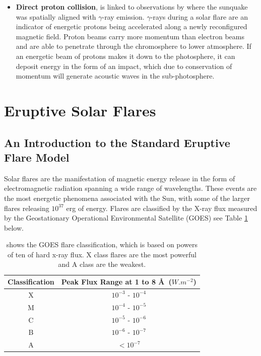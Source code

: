 \begin{itemize}
\item \textbf{Direct proton collision}, is linked to observations by \cite{2007ApJ...664..573Z} where the sunquake was spatially aligned with $\gamma$-ray emission. $\gamma$-rays during a solar flare are an indicator of energetic protons being accelerated along a newly reconfigured magnetic field. Proton beams carry more momentum than electron beams and are able to penetrate through the chromosphere to lower atmosphere. If an energetic beam of protons makes it down to the photosphere, it can deposit energy in the form of an impact, which due to conservation of momentum will generate acoustic waves in the sub-photosphere. \\

\end{itemize}

\section{Eruptive Solar Flares}
\subsection{An Introduction to the Standard Eruptive Flare Model} 

Solar flares are the manifestation of magnetic energy release in the form of electromagnetic radiation spanning a wide range of wavelengths. These events are the most energetic phenomena associated with the Sun, with some of the larger flares releasing $10^{37}$ erg of energy. Flares are classified by the X-ray flux measured by the Geostationary Operational Environmental Satellite (GOES) see Table \ref{goes} below. \\

\begin{table}[h]
\centering
\begin{tabular}{|c|c|}\label{GOES}
Classification & Peak Flux Range at 1 to 8 \AA\ ($W.m^{-2}$)\\ 
\hline
X & $10^{-3}$ - $10^{-4}$\\ 
M & $10^{-4}$ - $10^{-5}$\\ 
C & $10^{-5}$ - $10^{-6}$\\ 
B & $10^{-6}$ - $10^{-7}$\\ 
A & $<10^{-7}$\\  
\end{tabular}
\caption{shows the GOES flare classification, which is based on powers of ten of hard x-ray flux. X class flares are the most powerful and A class are the weakest.}\label{goes}
\end{table}

